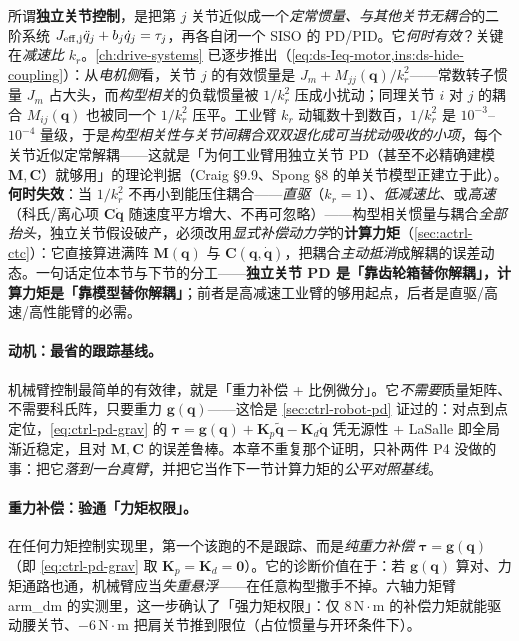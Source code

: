 \begin{insight}
\label{ins:actrl-decouple-valid}
所谓\textbf{独立关节控制}，是把第 $j$ 关节近似成一个\emph{定常惯量、与其他关节无耦合}的二阶系统 $J_{\rm eff,j}\ddot q_j+b_j\dot q_j=\tau_j$，再各自闭一个 SISO 的 PD/PID。它\emph{何时有效}？关键在\emph{减速比} $k_r$。\cref{ch:drive-systems} 已逐步推出（\cref{eq:ds-Ieq-motor,ins:ds-hide-coupling}）：从\emph{电机侧}看，关节 $j$ 的有效惯量是 $J_{m}+M_{jj}(\mathbf{q})/k_r^2$——常数转子惯量 $J_m$ 占大头，而\emph{构型相关}的负载惯量被 $1/k_r^2$ 压成小扰动；同理关节 $i$ 对 $j$ 的耦合 $M_{ij}(\mathbf{q})$ 也被同一个 $1/k_r^2$ 压平。工业臂 $k_r$ 动辄数十到数百，$1/k_r^2$ 是 $10^{-3}$--$10^{-4}$ 量级，于是\emph{构型相关性与关节间耦合双双退化成可当扰动吸收的小项}，每个关节近似定常解耦——这就是「为何工业臂用独立关节 PD（甚至不必精确建模 $\mathbf{M},\mathbf{C}$）就够用」的理论判据（Craig\cite{craig2005introduction} §9.9、Spong\cite{spong2006robot} §8 的单关节模型正建立于此）。\textbf{何时失效}：当 $1/k_r^2$ 不再小到能压住耦合——\emph{直驱}（$k_r=1$）、\emph{低减速比}、或\emph{高速}（科氏/离心项 $\mathbf{C}\dot{\mathbf{q}}$ 随速度平方增大、不再可忽略）——构型相关惯量与耦合\emph{全部抬头}，独立关节假设破产，必须改用\emph{显式补偿动力学}的\textbf{计算力矩}（\cref{sec:actrl-ctc}）：它直接算进满阵 $\mathbf{M}(\mathbf{q})$ 与 $\mathbf{C}(\mathbf{q},\dot{\mathbf{q}})$，把耦合\emph{主动抵消}成解耦的误差动态。一句话定位本节与下节的分工——\textbf{独立关节 PD 是「靠齿轮箱替你解耦」，计算力矩是「靠模型替你解耦」}；前者是高减速工业臂的够用起点，后者是直驱/高速/高性能臂的必需。
\end{insight}

\paragraph{动机：最省的跟踪基线。}
机械臂控制最简单的有效律，就是「重力补偿 + 比例微分」。它\emph{不需要}质量矩阵、不需要科氏阵，只要重力 $\mathbf{g}(\mathbf{q})$——这恰是 \cref{sec:ctrl-robot-pd} 证过的：对点到点定位，\cref{eq:ctrl-pd-grav} 的 $\boldsymbol{\tau}=\mathbf{g}(\mathbf{q})+\mathbf{K}_p\tilde{\mathbf{q}}-\mathbf{K}_d\dot{\mathbf{q}}$ 凭无源性 + LaSalle 即全局渐近稳定，且对 $\mathbf{M},\mathbf{C}$ 的误差鲁棒。本章不重复那个证明，只补两件 P4 没做的事：把它\emph{落到一台真臂}，并把它当作下一节计算力矩的\emph{公平对照基线}。

\paragraph{重力补偿：验通「力矩权限」。}
在任何力矩控制实现里，第一个该跑的不是跟踪、而是\emph{纯重力补偿} $\boldsymbol{\tau}=\mathbf{g}(\mathbf{q})$（即 \cref{eq:ctrl-pd-grav} 取 $\mathbf{K}_p=\mathbf{K}_d=\mathbf{0}$）。它的诊断价值在于：若 $\mathbf{g}(\mathbf{q})$ 算对、力矩通路也通，机械臂应当\emph{失重悬浮}——在任意构型撒手不掉。六轴力矩臂 arm\_dm 的实测里，这一步确认了「强力矩权限」：仅 $8\,\mathrm{N\!\cdot\!m}$ 的补偿力矩就能驱动腰关节、$-6\,\mathrm{N\!\cdot\!m}$ 把肩关节推到限位（占位惯量与开环条件下）。

